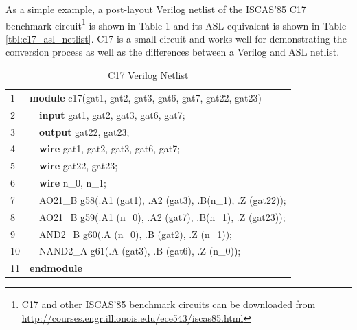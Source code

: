 \documentclass[12pt]{report}
\begin{document}
As a simple example, a post-layout Verilog netlist of the ISCAS'85 C17 benchmark circuit\footnote{C17 and other ISCAS'85 benchmark circuits can be downloaded from \url{http://courses.engr.illionois.edu/ece543/iscas85.html}} is shown in Table \ref{tbl:c17_verilog_netlist} and its ASL equivalent is shown in Table \ref{tbl:c17_asl_netlist}.  C17 is a small circuit and works well for demonstrating the conversion process as well as the differences between a Verilog and ASL netlist. 
\begin{table}
  \begin{center}
    \caption{C17 Verilog Netlist}
    \begin{tabular}{|l|ll|}
      \hline
      1 & \multicolumn{2}{l|}{\textbf{module} c17(gat1, gat2, gat3, gat6, gat7, gat22, gat23)} \\
      2 & & \textbf{input} gat1, gat2, gat3, gat6, gat7; \\ 
      3 & & \textbf{output} gat22, gat23; \\ 
      4 & & \textbf{wire} gat1, gat2, gat3, gat6, gat7; \\ 
      5 & & \textbf{wire} gat22, gat23; \\ 
      6 & & \textbf{wire} n\_0, n\_1; \\ 
      7 & & AO21\_B g58(.A1 (gat1), .A2 (gat3), .B(n\_1), .Z (gat22)); \\
      8 & & AO21\_B g59(.A1 (n\_0), .A2 (gat7), .B(n\_1), .Z (gat23)); \\
      9 & & AND2\_B g60(.A (n\_0), .B (gat2), .Z (n\_1)); \\ 
      10 & & NAND2\_A g61(.A (gat3), .B (gat6), .Z (n\_0)); \\ 
      11 & \multicolumn{2}{l|}{\textbf{endmodule}} \\ 
      \hline
    \end{tabular}
    \label{tbl:c17_verilog_netlist}
  \end{center}
\end{table}
\end{document}
